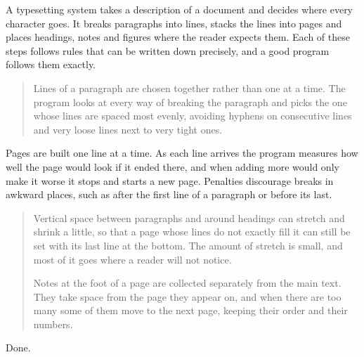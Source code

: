 \documentclass{article}
\begin{document}
A typesetting system takes a description of a document and decides where every character goes. It breaks paragraphs into lines, stacks the lines into pages and places headings, notes and figures where the reader expects them. Each of these steps follows rules that can be written down precisely, and a good program follows them exactly.
\begin{quote}
Lines of a paragraph are chosen together rather than one at a time. The program looks at every way of breaking the paragraph and picks the one whose lines are spaced most evenly, avoiding hyphens on consecutive lines and very loose lines next to very tight ones.
\end{quote}
Pages are built one line at a time. As each line arrives the program measures how well the page would look if it ended there, and when adding more would only make it worse it stops and starts a new page. Penalties discourage breaks in awkward places, such as after the first line of a paragraph or before its last.
\begin{quotation}
Vertical space between paragraphs and around headings can stretch and shrink a little, so that a page whose lines do not exactly fill it can still be set with its last line at the bottom. The amount of stretch is small, and most of it goes where a reader will not notice.

Notes at the foot of a page are collected separately from the main text. They take space from the page they appear on, and when there are too many some of them move to the next page, keeping their order and their numbers.
\end{quotation}
Done.
\end{document}
